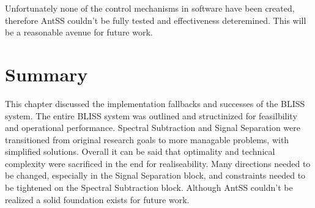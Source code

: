 Unfortunately none of the control mechanisms in software have been created, therefore AntSS couldn't be fully tested and effectiveness deteremined.  This will be a reasonable avenue for future work.\\

\section{Summary}

This chapter discussed the implementation fallbacks and successes of the BLISS system.  The entire BLISS system was outlined and structinized for feasilbility and operational performance.  Spectral Subtraction and Signal Separation were transitioned from original research goals to more managable problems, with simplified solutions.  Overall it can be said that optimality and technical complexity were sacrificed in the end for realiseability.  Many directions needed to be changed, especially in the Signal Separation block, and constraints needed to be tightened on the Spectral Subtraction block.  Although AntSS couldn't be realized a solid foundation exists for future work.\\ 




